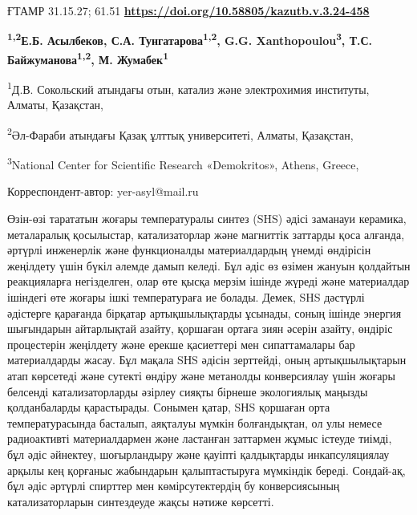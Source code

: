 \newpage
ҒТАМР 31.15.27; 61.51
\hfill {\bfseries \href{https://doi.org/10.58805/kazutb.v.3.24-458}{https://doi.org/10.58805/kazutb.v.3.24-458}}


\begin{center}
{\bfseries \textsuperscript{1,2}Е.Б. Асылбеков, С.А. Тунгатарова\textsuperscript{1,2}, G.G. Xanthopoulou\textsuperscript{3}, Т.С. Байжуманова\textsuperscript{1,2}, М. Жумабек\textsuperscript{1}}

\textsuperscript{1}Д.В. Сокольский атындағы отын, катализ және
электрохимия институты, Алматы, Қазақстан,

\textsuperscript{2}Әл-Фараби атындағы Қазақ ұлттық университеті, Алматы,
Қазақстан,

\textsuperscript{3}National Center for Scientific Research «Demokritos»,
Athens, Greece,

Корреспондент-автор: yer-asyl@mail.ru
\end{center}

Өзін-өзі тарататын жоғары температуралы синтез (SHS) әдісі заманауи
керамика, металаралық қосылыстар, катализаторлар және магниттік заттарды
қоса алғанда, әртүрлі инженерлік және функционалды материалдардың үнемді
өндірісін жеңілдету үшін бүкіл әлемде дамып келеді. Бұл әдіс өз өзімен
жануын қолдайтын реакцияларға негізделген, олар өте қысқа мерзім ішінде
жүреді және материалдар ішіндегі өте жоғары ішкі температураға ие
болады. Демек, SHS дәстүрлі әдістерге қарағанда бірқатар артықшылықтарды
ұсынады, соның ішінде энергия шығындарын айтарлықтай азайту, қоршаған
ортаға зиян әсерін азайту, өндіріс процестерін жеңілдету және ерекше
қасиеттері мен сипаттамалары бар материалдарды жасау. Бұл мақала SНS
әдісін зерттейді, оның артықшылықтарын атап көрсетеді және сутекті
өндіру және метанолды конверсиялау үшін жоғары белсенді катализаторларды
әзірлеу сияқты бірнеше экологиялық маңызды қолданбаларды қарастырады.
Сонымен қатар, SНS қоршаған орта температурасында басталып, аяқталуы
мүмкін болғандықтан, ол улы немесе радиоактивті материалдармен және
ластанған заттармен жұмыс істеуде тиімді, бұл әдіс әйнектеу,
шоғырландыру және қауіпті қалдықтарды инкапсуляциялау арқылы кең
қорғаныс жабындарын қалыптастыруға мүмкіндік береді. Сондай-ақ, бұл әдіс
әртүрлі спирттер мен көмірсутектердің бу конверсиясының катализаторларын
синтездеуде жақсы нәтиже көрсетті.

